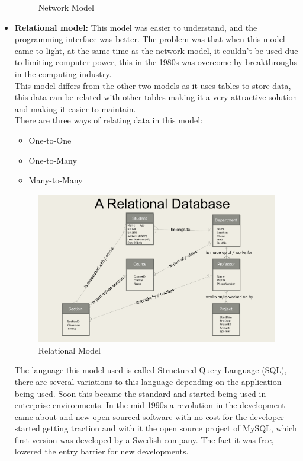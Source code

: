 \begin{itemize}
{\begin{center}
\begin{figure}[h!]
			\caption{Network Model}
			\label{net_model}
		\end{figure}
	\end{center}
	}
	\item {\textbf{Relational model:} This model was easier to understand, and the programming interface was better. The problem was that when this model came to light, at the same time as the network model, it couldn’t be used due to limiting computer power, this in the 1980s was overcome by breakthroughs in the computing industry.\\
	This model differs from the other two models as it uses tables to store data, this data can be related with other tables making it a very attractive solution and making it easier to maintain.\\
	There are three ways of relating data in this model:
	\begin{itemize}
		\item {One-to-One}
		\item {One-to-Many}
		\item {Many-to-Many}
	\end{itemize}
	\begin{center}
		\begin{figure}[h!]
			\centering
			\includegraphics[scale=0.25]{./images/3-relational-model}
			\caption{Relational Model}
			\label{rel_model}
		\end{figure}
	\end{center}
	The language this model used is called Structured Query Language (SQL), there are several variations to this language depending on the application being used. Soon this became the standard and started being used in enterprise environments. In the mid-1990s a revolution in the development came about and new open sourced software with no cost for the developer started getting traction and with it the open source project of MySQL, which first version was developed by a Swedish company. The fact it was free, lowered the entry barrier for new developments.
}
\end{itemize}
